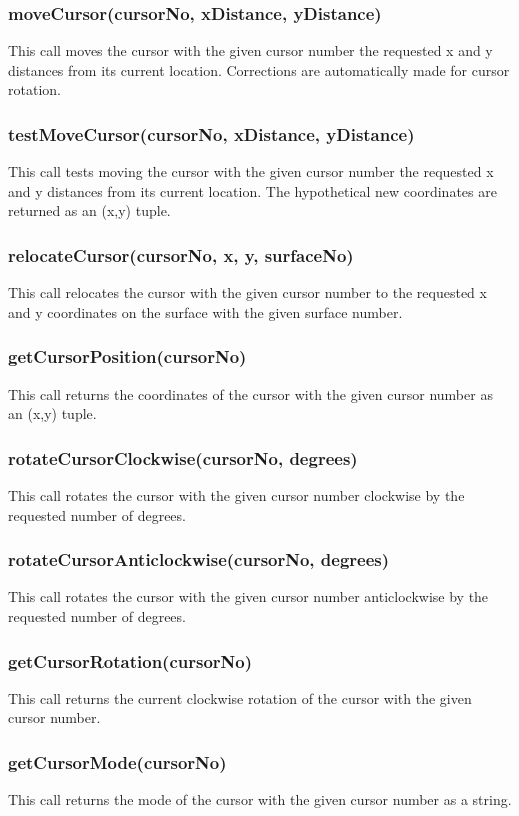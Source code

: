 \documentclass{acm_proc_article-sp}
\begin{document}
\subsubsection{moveCursor(cursorNo, xDistance, yDistance)}
This call moves the cursor with the given cursor number the requested x and y distances from its current location. Corrections are automatically made for cursor rotation.
\subsubsection{testMoveCursor(cursorNo, xDistance, yDistance)}
This call tests moving the cursor with the given cursor number the requested x and y distances from its current location. The hypothetical new coordinates are returned as an (x,y) tuple.
\subsubsection{relocateCursor(cursorNo, x, y, surfaceNo)}
This call relocates the cursor with the given cursor number to the requested x and y coordinates on the surface with the given surface number.
\subsubsection{getCursorPosition(cursorNo)}
This call returns the coordinates of the cursor with the given cursor number as an (x,y) tuple.
\subsubsection{rotateCursorClockwise(cursorNo, degrees)}
This call rotates the cursor with the given cursor number clockwise by the requested number of degrees.
\subsubsection{rotateCursorAnticlockwise(cursorNo, degrees)}
This call rotates the cursor with the given cursor number anticlockwise by the requested number of degrees.
\subsubsection{getCursorRotation(cursorNo)}
This call returns the current clockwise rotation of the cursor with the given cursor number.
\subsubsection{getCursorMode(cursorNo)}
This call returns the mode of the cursor with the given cursor number as a string.
\end{document}
